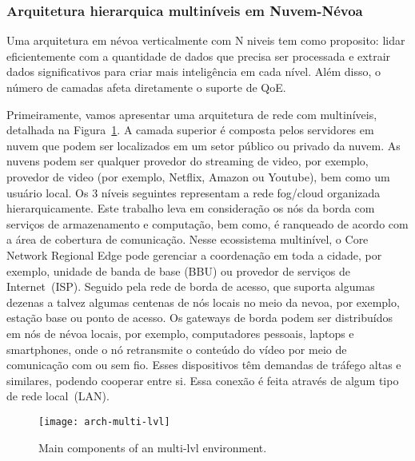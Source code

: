 \subsubsection{Arquitetura hierarquica multiníveis em Nuvem-Névoa}
Uma arquitetura em névoa verticalmente com N niveis tem como proposito: lidar eficientemente com a quantidade de dados que precisa ser processada e extrair dados significativos para criar mais inteligência em cada nível. Além disso, o número de camadas afeta diretamente o suporte de QoE.

Primeiramente, vamos apresentar uma arquitetura de rede com multiníveis, detalhada na Figura~\ref{fig:arch-multi-lvl}. A camada superior é composta pelos servidores em nuvem que podem ser localizados em um setor público ou privado da nuvem. As nuvens podem ser qualquer provedor do streaming de video, por exemplo, provedor de video (por exemplo, Netflix, Amazon ou Youtube), bem como um usuário local. %
Os 3 níveis seguintes representam a rede fog/cloud organizada hierarquicamente. Este  trabalho leva em consideração os nós da borda com serviços de armazenamento e computação, bem como, é ranqueado de acordo com a área de cobertura de comunicação. Nesse ecossistema multinível, o Core Network Regional Edge pode gerenciar a coordenação em toda a cidade, por exemplo, unidade de banda de base (BBU) ou provedor de serviços de Internet~(ISP). Seguido pela rede de borda de acesso, que suporta algumas dezenas a talvez algumas centenas de nós locais no meio da nevoa, por exemplo, estação base ou ponto de acesso. Os gateways de borda podem ser distribuídos em nós de névoa locais, por exemplo, computadores pessoais, laptops e smartphones, onde o nó retransmite o conteúdo do vídeo por meio de comunicação com ou sem fio. Esses dispositivos têm demandas de tráfego altas e similares, podendo cooperar entre si. Essa conexão é feita através de algum tipo de rede local~(LAN).

\begin{figure}[htb]
  \centering
  \texttt{[image: arch-multi-lvl]}
  \caption{Main components of an multi-lvl environment.}
  \label{fig:arch-multi-lvl}
\end{figure}

